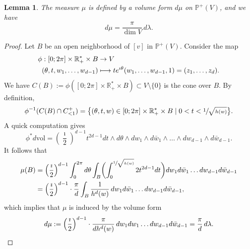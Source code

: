 \documentclass[JEP,XML,SOM,Unicode]{cedram}
\newcommand\mto{\mathchoice{\longmapsto}{\mapsto}{\mapsto}{\mapsto}}
\theoremstyle{plain}
\newtheorem{Lemma}[Theorem]{Lemma}
\theoremstyle{definition}
\newcommand{\R}{\mathbb{R}}
\newcommand{\Pb}{\mathbb{P}}
\newcommand{\vol}{\mathrm{vol}}
\begin{document}
\begin{Lemma}\label{lm:pushed:vol:form}
The measure $\mu$ is defined by a volume form $d\mu$ on $\Pb^+(V)$, and we have
\[
d\mu=\frac{\pi}{\dim V}\,d\lambda.
\]
\end{Lemma}
\begin{proof}
Let $B$ be an open neighborhood of $[v]$ in $\Pb^+(V)$. Consider the map
\begin{align*}
\phi: [0;2\pi]\times\R_+^*\times B & \to V\\
 (\theta,t,w_1,\dots,w_{d-1}) & \mto te^{\imath\theta}(w_1,\dots,w_{d-1},1)=(z_1,\dots,z_d).
\end{align*}
We have $C(B):=\phi([0;2\pi]\times\R^*_+\times B)\subset V\setminus\{0\}$ is the cone over $B$. By definition,
\[
\phi^{-1}(C(B)\cap C^+_{<1})=\bigl\{(\theta,t,w) \in [0;2\pi]\times\R_+^*\times B\mid 0< t < \sfrac{1}{\sqrt{h(w)}}\bigr\}.
\]
A quick computation gives
\[
\phi^*d\vol=\left(\frac{\imath}{2}\right)^{d-1} t^{2d-1}dt\wedge d\theta\wedge dw_1\wedge d\bar{w}_1\wedge\dots\wedge dw_{d-1}\wedge d\bar{w}_{d-1}.
\]
It follows that
\begin{align*}
\mu(B)&= \left(\frac{\imath}{2}\right)^{d-1} \int_0^{2\pi}d\theta \int_B \biggl(\int_0^{\sfrac{1}{\sqrt{h(w)}}} 2t^{2d-1}dt\biggr) dw_1d\bar{w}_1\dots dw_{d-1}d\bar{w}_{d-1}\\
&= \left(\frac{\imath}{2}\right)^{d-1}\cdot\frac{\pi}{d}\int_B \frac{1}{h^{d}(w)}\,dw_1d\bar{w}_1\dots dw_{d-1}d\bar{w}_{d-1},
\end{align*}
which implies that $\mu$ is induced by the volume form
\[
d\mu:=\left(\frac{\imath}{2}\right)^{d-1}\cdot\frac{\pi}{dh^d(w)}\,dw_1dw_1\dots dw_{d-1}d\bar{w}_{d-1}=\frac{\pi}{d}\,d\lambda.\qedhere
\]
\end{proof}
\end{document}
